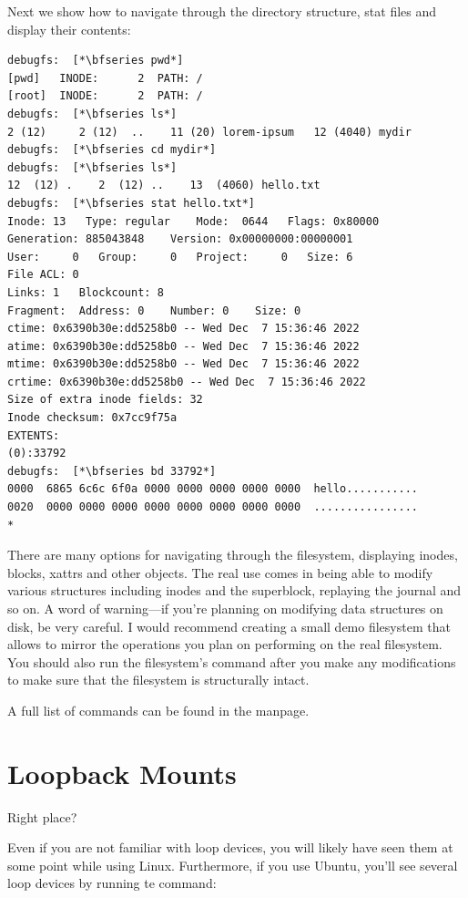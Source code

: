 \noindent
Next we show how to navigate through the directory structure, stat files and display their contents:

\begin{lstlisting}
debugfs:  [*\bfseries pwd*]
[pwd]   INODE:      2  PATH: /
[root]  INODE:      2  PATH: /
debugfs:  [*\bfseries ls*]
2 (12)     2 (12)  ..    11 (20) lorem-ipsum   12 (4040) mydir
debugfs:  [*\bfseries cd mydir*]
debugfs:  [*\bfseries ls*]
12  (12) .    2  (12) ..    13  (4060) hello.txt
debugfs:  [*\bfseries stat hello.txt*]
Inode: 13   Type: regular    Mode:  0644   Flags: 0x80000
Generation: 885043848    Version: 0x00000000:00000001
User:     0   Group:     0   Project:     0   Size: 6
File ACL: 0
Links: 1   Blockcount: 8
Fragment:  Address: 0    Number: 0    Size: 0
ctime: 0x6390b30e:dd5258b0 -- Wed Dec  7 15:36:46 2022
atime: 0x6390b30e:dd5258b0 -- Wed Dec  7 15:36:46 2022
mtime: 0x6390b30e:dd5258b0 -- Wed Dec  7 15:36:46 2022
crtime: 0x6390b30e:dd5258b0 -- Wed Dec  7 15:36:46 2022
Size of extra inode fields: 32
Inode checksum: 0x7cc9f75a
EXTENTS:
(0):33792
debugfs:  [*\bfseries bd 33792*]
0000  6865 6c6c 6f0a 0000 0000 0000 0000 0000  hello...........
0020  0000 0000 0000 0000 0000 0000 0000 0000  ................
*
\end{lstlisting}

\noindent 
There are many options for navigating through the filesystem, displaying inodes, blocks, xattrs and other objects. The real use comes in being able to modify various structures including inodes and the superblock, replaying the journal and so on. A word of warning---if you're planning on modifying data structures on disk, be very careful. I would recommend creating a small demo filesystem that allows to mirror the operations you plan on performing on the real filesystem. You should also run the filesystem's  command after you make any modifications to make sure that the filesystem is structurally intact.

A full list of commands can be found in the  manpage.


\section{Loopback Mounts}

Right place? 

Even if you are not familiar with loop devices, you will likely have seen them at some point while using Linux. Furthermore, if you use Ubuntu, you’ll see several loop devices by running te  command:

